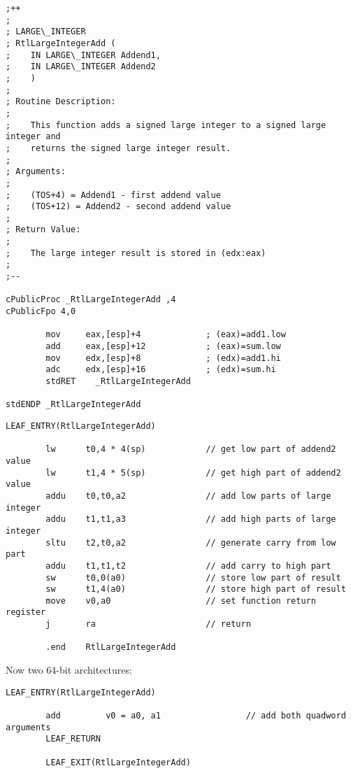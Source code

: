 \begin{lstlisting}[style=customasmx86,caption=i386 arch]
;++
;
; LARGE\_INTEGER
; RtlLargeIntegerAdd (
;    IN LARGE\_INTEGER Addend1,
;    IN LARGE\_INTEGER Addend2
;    )
;
; Routine Description:
;
;    This function adds a signed large integer to a signed large integer and
;    returns the signed large integer result.
;
; Arguments:
;
;    (TOS+4) = Addend1 - first addend value
;    (TOS+12) = Addend2 - second addend value
;
; Return Value:
;
;    The large integer result is stored in (edx:eax)
;
;--

cPublicProc _RtlLargeIntegerAdd ,4
cPublicFpo 4,0

        mov     eax,[esp]+4             ; (eax)=add1.low
        add     eax,[esp]+12            ; (eax)=sum.low
        mov     edx,[esp]+8             ; (edx)=add1.hi
        adc     edx,[esp]+16            ; (edx)=sum.hi
        stdRET    _RtlLargeIntegerAdd

stdENDP _RtlLargeIntegerAdd
\end{lstlisting}

\begin{lstlisting}[caption=MIPS arch]
        LEAF_ENTRY(RtlLargeIntegerAdd)

        lw      t0,4 * 4(sp)            // get low part of addend2 value
        lw      t1,4 * 5(sp)            // get high part of addend2 value
        addu    t0,t0,a2                // add low parts of large integer
        addu    t1,t1,a3                // add high parts of large integer
        sltu    t2,t0,a2                // generate carry from low part
        addu    t1,t1,t2                // add carry to high part
        sw      t0,0(a0)                // store low part of result
        sw      t1,4(a0)                // store high part of result
        move    v0,a0                   // set function return register
        j       ra                      // return

        .end    RtlLargeIntegerAdd
\end{lstlisting}

Now two 64-bit architectures:

\begin{lstlisting}[caption=Itanium arch]
        LEAF_ENTRY(RtlLargeIntegerAdd)

        add         v0 = a0, a1                 // add both quadword arguments
        LEAF_RETURN

        LEAF_EXIT(RtlLargeIntegerAdd)
\end{lstlisting}

